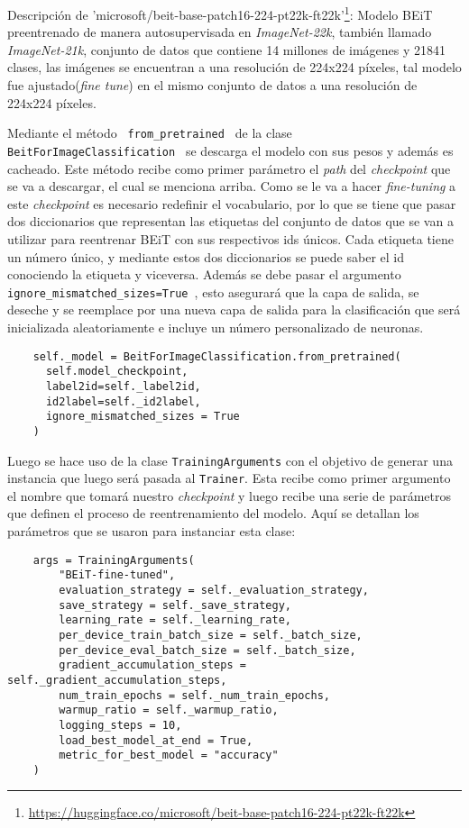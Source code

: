Descripción de 'microsoft/beit-base-patch16-224-pt22k-ft22k'\footnote[1]{\url{https://huggingface.co/microsoft/beit-base-patch16-224-pt22k-ft22k}}: Modelo BEiT preentrenado de manera autosupervisada en \textit{ImageNet-22k}, también llamado \textit{ImageNet-21k}, conjunto de datos que contiene 14 millones de imágenes y 21841 clases, las imágenes se encuentran a una resolución de 224x224 píxeles, tal modelo fue ajustado(\textit{fine tune}) en el mismo conjunto de datos a una resolución de 224x224 píxeles.

Mediante el método \texttt{ from\_pretrained } de  la clase \texttt{ BeitForImageClassification } se descarga el modelo con sus pesos y además es cacheado. Este método recibe como primer parámetro el \textit{path} del \textit{checkpoint} que se va a descargar, el cual se menciona arriba. Como se le va a hacer \textit{fine-tuning} a este \textit{checkpoint} es necesario redefinir el vocabulario, por lo que se tiene que pasar dos diccionarios que representan las etiquetas del conjunto de datos que se van a utilizar para reentrenar BEiT con sus respectivos ids únicos. Cada etiqueta tiene un número único, y mediante estos dos diccionarios se puede saber el id conociendo la etiqueta y viceversa. Además se debe pasar el argumento \texttt{ ignore\_mismatched\_sizes=True }, esto asegurará que la capa de salida, se deseche y se reemplace por una nueva capa de salida para la clasificación que será inicializada aleatoriamente e incluye un número personalizado de neuronas.

\begin{verbatim}
    self._model = BeitForImageClassification.from_pretrained(
      self.model_checkpoint,
      label2id=self._label2id,
      id2label=self._id2label,
      ignore_mismatched_sizes = True
    )
\end{verbatim}

Luego se hace uso de la clase \texttt{TrainingArguments} con el objetivo de generar una instancia que luego será pasada al \texttt{Trainer}. Esta recibe como primer argumento el nombre que tomará nuestro \textit{checkpoint} y luego recibe una serie de parámetros que definen el proceso de reentrenamiento del modelo. Aquí se detallan los parámetros que se usaron para instanciar esta clase:

\begin{verbatim}
    args = TrainingArguments(
        "BEiT-fine-tuned",
        evaluation_strategy = self._evaluation_strategy,
        save_strategy = self._save_strategy,
        learning_rate = self._learning_rate,
        per_device_train_batch_size = self._batch_size,
        per_device_eval_batch_size = self._batch_size,
        gradient_accumulation_steps = self._gradient_accumulation_steps,
        num_train_epochs = self._num_train_epochs,
        warmup_ratio = self._warmup_ratio,
        logging_steps = 10,
        load_best_model_at_end = True,
        metric_for_best_model = "accuracy"
    )
\end{verbatim}

